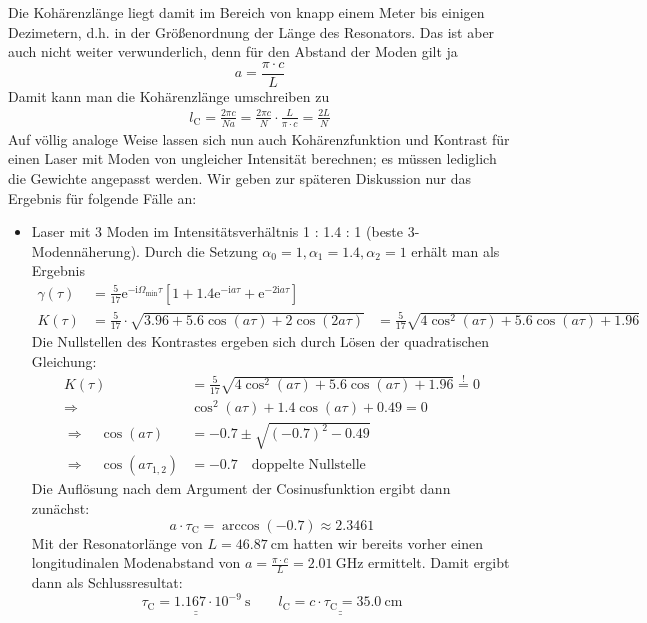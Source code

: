 \documentclass[german,  %
parskip=full,  %
]{scrartcl}
\begin{document}
Die Kohärenzlänge liegt damit im Bereich von knapp einem Meter bis einigen Dezimetern, d.h. in der Größenordnung der Länge des Resonators. Das ist aber auch nicht weiter verwunderlich, denn für den Abstand der Moden gilt ja
\[a = \frac{\pi\cdot c}{L}\]
Damit kann man die Kohärenzlänge umschreiben zu
\begin{align}
l_{\mathrm{C}} = \frac{2\pi c}{Na} = \frac{2\pi c}{N}\cdot\frac{L}{\pi\cdot c} = \frac{2L}{N} 
\end{align}
Auf völlig analoge Weise lassen sich nun auch Kohärenzfunktion und Kontrast für einen Laser mit Moden von ungleicher Intensität berechnen; es müssen lediglich die Gewichte angepasst werden. Wir geben zur späteren Diskussion nur das Ergebnis für folgende Fälle an:
\begin{itemize}
\item Laser mit 3 Moden im Intensitätsverhältnis 1 : 1.4 : 1 (beste 3-Modennäherung). Durch die Setzung \(\alpha_0 = 1,\alpha_1 = 1.4, \alpha_2 = 1\) erhält man als Ergebnis
\begin{align*}
\gamma(\tau) &= \frac{5}{17}\mathrm{e}^{-\mathrm{i}\Omega_{\mathrm{min}}\tau} \left[1 + 1.4\mathrm{e}^{-\mathrm{i}a\tau} + \mathrm{e}^{-2\mathrm{i}a\tau}\right] \\
K(\tau) &= \frac{5}{17}\cdot\sqrt{3.96 + 5.6\cos(a\tau) + 2\cos(2a\tau)}
&= \frac{5}{17}\sqrt{4\cos^2(a\tau) + 5.6\cos(a\tau) + 1.96}
\end{align*}
Die Nullstellen des Kontrastes ergeben sich durch Lösen der quadratischen Gleichung:
\begin{align*}
K(\tau) &= \frac{5}{17}\sqrt{4\cos^2(a\tau) + 5.6\cos(a\tau) + 1.96} \overset{!}{=} 0 \\
\Longrightarrow\quad  &\cos^2(a\tau) + 1.4\cos(a\tau) + 0.49 = 0 \\
\Longrightarrow\quad \cos(a\tau) &= -0.7 \pm\sqrt{(-0.7)^2 - 0.49} \\
\Longrightarrow\quad \cos(a\tau_{1,2}) &= -0.7 \quad\text{doppelte Nullstelle}
\end{align*}
Die Auflösung nach dem Argument der Cosinusfunktion ergibt dann zunächst:
\[a\cdot\tau_{\mathrm{C}} = \arccos(-0.7) \approx 2.3461\]
Mit der Resonatorlänge von \(L = 46.87 \ \mathrm{cm}\) hatten wir bereits vorher einen longitudinalen Modenabstand von \(a = \frac{\pi\cdot c}{L} = 2.01 \ \mathrm{GHz}\) ermittelt. Damit ergibt dann als Schlussresultat:
\[\underline{\underline{\tau_{\mathrm{C}} = 1.167\cdot 10^{-9} \ \mathrm{s}}} \quad \quad \underline{\underline{l_{\mathrm{C}} = c\cdot\tau_{\mathrm{C}} = 35.0 \ \mathrm{cm}}}\]

\end{itemize}
\end{document}
